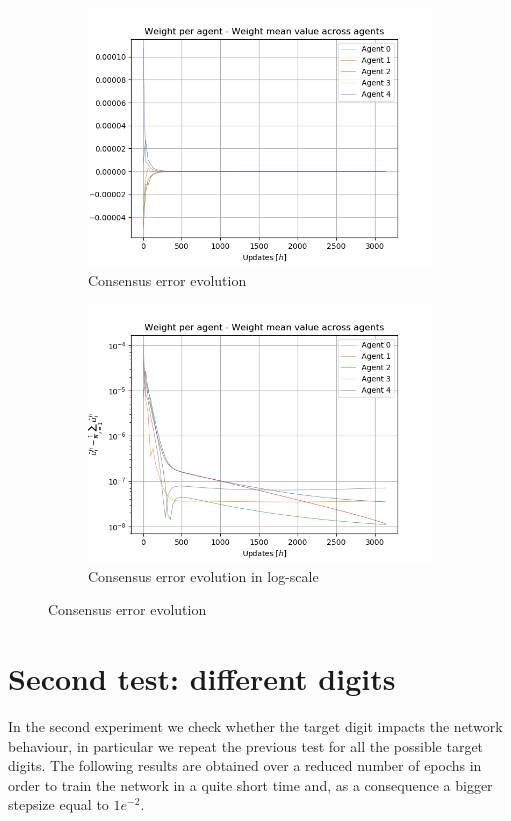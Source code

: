 \documentclass[a4paper,11pt,oneside]{book}
\begin{document}
\begin{figure}[h]
\centering
	\begin{subfigure}{0.49\textwidth}	
	\includegraphics[width=\textwidth]{cycle/weight_100}
	\caption{Consensus error evolution}
	\end{subfigure}
\hfill
	\begin{subfigure}{0.49\textwidth}	
	\includegraphics[width=\textwidth]{cycle/weight_100_log}
	\caption{Consensus error evolution in log-scale}
	\end{subfigure}
\caption{Consensus error evolution}
\label{cycle_consensus}
\end{figure}

\section{Second test: different digits}
In the second experiment we check whether the target digit impacts the network behaviour, in particular we repeat the previous test for all the possible target digits. The following results are obtained over a reduced number of epochs in order to train the network in a quite short time and, as a consequence a bigger stepsize equal to $1e^{-2}$.
\end{document}
